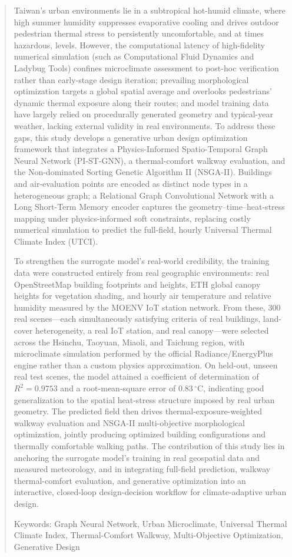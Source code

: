 \begin{abstract}

Taiwan's urban environments lie in a subtropical hot-humid climate, where high summer humidity suppresses evaporative cooling and drives outdoor pedestrian thermal stress to persistently uncomfortable, and at times hazardous, levels. However, the computational latency of high-fidelity numerical simulation (such as Computational Fluid Dynamics and Ladybug Tools) confines microclimate assessment to post-hoc verification rather than early-stage design iteration; prevailing morphological optimization targets a global spatial average and overlooks pedestrians' dynamic thermal exposure along their routes; and model training data have largely relied on procedurally generated geometry and typical-year weather, lacking external validity in real environments. To address these gaps, this study develops a generative urban design optimization framework that integrates a Physics-Informed Spatio-Temporal Graph Neural Network (PI-ST-GNN), a thermal-comfort walkway evaluation, and the Non-dominated Sorting Genetic Algorithm II (NSGA-II). Buildings and air-evaluation points are encoded as distinct node types in a heterogeneous graph; a Relational Graph Convolutional Network with a Long Short-Term Memory encoder captures the geometry–time–heat-stress mapping under physics-informed soft constraints, replacing costly numerical simulation to predict the full-field, hourly Universal Thermal Climate Index (UTCI).

To strengthen the surrogate model's real-world credibility, the training data were constructed entirely from real geographic environments: real OpenStreetMap building footprints and heights, ETH global canopy heights for vegetation shading, and hourly air temperature and relative humidity measured by the MOENV IoT station network. From these, 300 real scenes—each simultaneously satisfying criteria of real buildings, land-cover heterogeneity, a real IoT station, and real canopy—were selected across the Hsinchu, Taoyuan, Miaoli, and Taichung region, with microclimate simulation performed by the official Radiance/EnergyPlus engine rather than a custom physics approximation. On held-out, unseen real test scenes, the model attained a coefficient of determination of $R^2 = 0.9753$ and a root-mean-square error of $0.83\,^{\circ}\mathrm{C}$, indicating good generalization to the spatial heat-stress structure imposed by real urban geometry. The predicted field then drives thermal-exposure-weighted walkway evaluation and NSGA-II multi-objective morphological optimization, jointly producing optimized building configurations and thermally comfortable walking paths. The contribution of this study lies in anchoring the surrogate model's training in real geospatial data and measured meteorology, and in integrating full-field prediction, walkway thermal-comfort evaluation, and generative optimization into an interactive, closed-loop design-decision workflow for climate-adaptive urban design.

Keywords: Graph Neural Network, Urban Microclimate, Universal Thermal Climate Index, Thermal-Comfort Walkway, Multi-Objective Optimization, Generative Design

\end{abstract}
